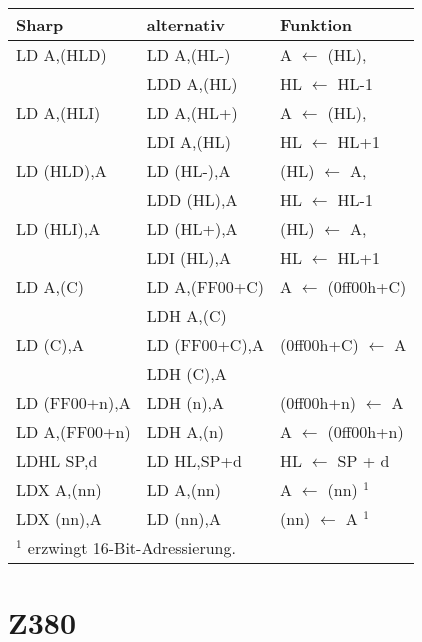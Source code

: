 \documentclass[12pt,a4paper,twoside]{report}
\begin{document}
\begin{center}\begin{tabular}{|l|l|l|}
\hline
Sharp & alternativ & Funktion \\
\hline
\hline
LD A,(HLD)    & LD A,(HL-)  & A $\longleftarrow$ (HL), \\
              & LDD A,(HL)  & HL $\longleftarrow$ HL-1 \\
\hline
LD A,(HLI)    & LD A,(HL+)  & A $\longleftarrow$ (HL), \\
              & LDI A,(HL)  & HL $\longleftarrow$ HL+1 \\
\hline
LD (HLD),A    & LD (HL-),A  & (HL) $\longleftarrow$ A, \\
              & LDD (HL),A  & HL $\longleftarrow$ HL-1 \\
\hline
LD (HLI),A    & LD (HL+),A  & (HL) $\longleftarrow$ A, \\
              & LDI (HL),A  & HL $\longleftarrow$ HL+1 \\
\hline
LD A,(C)      & LD A,(FF00+C) & A $\longleftarrow$ (0ff00h+C) \\
              & LDH A,(C)     & \\
\hline
LD (C),A      & LD (FF00+C),A & (0ff00h+C) $\longleftarrow$ A \\
              & LDH (C),A     & \\
\hline
LD (FF00+n),A & LDH (n),A     & (0ff00h+n) $\longleftarrow$ A \\
\hline
LD A,(FF00+n) & LDH A,(n)     & A $\longleftarrow$ (0ff00h+n) \\
\hline
LDHL SP,d     & LD HL,SP+d    & HL $\longleftarrow$ SP + d \\
\hline
LDX A,(nn)    & LD A,(nn)     & A $\longleftarrow$ (nn) $^{1}$ \\
\hline
LDX (nn),A    & LD (nn),A     & (nn) $\longleftarrow$ A $^{1}$ \\
\hline
\multicolumn{3}{|l|}{$^{1}$ erzwingt 16-Bit-Adressierung. } \\
\hline
\end{tabular}\end{center}
 

\section{Z380}
\end{document}

